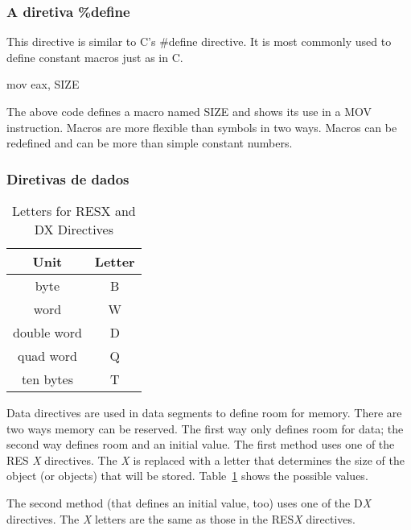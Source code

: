 \subsubsection{A diretiva \%define}

This directive is similar to C's {\code \#define} directive. It is
most commonly used to define constant macros just as in C.
\begin{AsmCodeListing}[frame=none, numbers=none]
      mov    eax, SIZE
\end{AsmCodeListing}
The above code defines a macro named {\code SIZE} and shows its use in
a {\code MOV} instruction. Macros are more flexible than symbols in
two ways. Macros can be redefined and can be more than simple constant
numbers.

\subsubsection{Diretivas de dados}

\begin{table}[t]
\centering
\begin{tabular}{||c|c||} \hline
{\bf Unit} & {\bf Letter} \\
\hline
byte & B \\
word & W \\
double word & D \\
quad word & Q \\
ten bytes & T \\
\hline
\end{tabular}
\caption{Letters for {\code RESX} and {\code DX} Directives
         \label{tab:size-letters} }
\end{table}

Data directives are used in data segments to define room for
memory. There are two ways memory can be reserved. The first way only
defines room for data; the second way defines room and an initial
value. The first method uses one of the {\code RES{\em
X}} directives. The {\em X} is replaced
with a letter that determines the size of the object (or objects) that
will be stored. Table~\ref{tab:size-letters} shows the possible
values.

The second method (that defines an initial value, too) uses one of the
{\code D{\em X}} directives. The {\em X}
letters are the same as those in the {\code RES{\em X}} directives.

